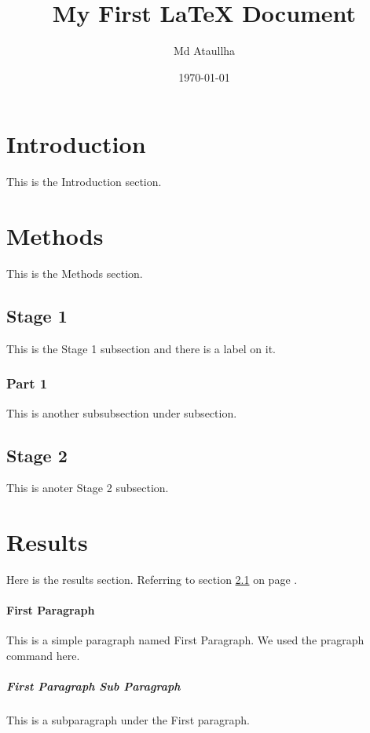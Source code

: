 \documentclass[a4paper,12pt]{article}
\begin{document}
\title{My First LaTeX Document}
\author{Md Ataullha}
\date{\today}
\maketitle

\tableofcontents
\newpage
{}

\section{Introduction}This is the Introduction section.

\section{Methods} 
This is the Methods section.

\subsection{Stage 1}
\label{sec1}
This is the Stage 1 subsection and there is a label on it.
\subsubsection{Part 1}
This is another subsubsection under subsection.


\subsection{Stage 2}
This is anoter Stage 2 subsection.

\section{Results}
Here is the results section. Referring to section \ref{sec1} on page \pageref{sec1}.

\paragraph{First Paragraph}
This is a simple paragraph named First Paragraph. We used the pragraph command here.
\subparagraph{First Paragraph Sub Paragraph}
This is a subparagraph under the First paragraph.
\end{document}
